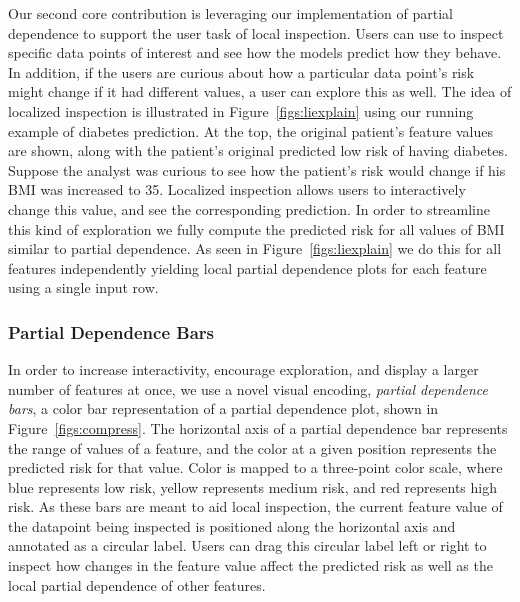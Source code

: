 


Our second core contribution is leveraging our implementation of partial dependence to support the user task of local inspection.  Users can use \prospector to inspect specific data points of interest and see how the models predict how they behave.  In addition, if the users are curious about how a particular data point's risk might change if it had different values, a user can explore this as well.  The idea of localized inspection is illustrated in Figure~\ref{figs:liexplain} using our running example of diabetes prediction.  At the top, the original patient's feature values are shown, along with the patient's original predicted low risk of having diabetes. Suppose the analyst was curious to see how the patient's risk would change if his BMI was increased to 35.
Localized inspection allows users to interactively change this value, and see the corresponding prediction.
In order to streamline this kind of exploration we fully compute the
predicted risk for all values of BMI similar to partial dependence.
As seen in Figure~\ref{figs:liexplain} we do this for all features independently
yielding local partial dependence plots for each feature using a single input row.



\subsubsection{Partial Dependence Bars}
In order to increase interactivity, encourage exploration, and display a larger number of features at once, we use a novel visual encoding, \emph{partial dependence bars}, a color bar representation of a partial dependence plot, shown in Figure~\ref{figs:compress}. The horizontal axis of a partial dependence bar represents the range of values of a feature, and the color at a given position represents the predicted risk for that value.  Color is mapped to a three-point color scale, where blue represents low risk, yellow represents medium risk, and red represents high risk.  As these bars are meant to aid local inspection, the current feature value of the datapoint being inspected is positioned along the horizontal axis and annotated as a circular label.  Users can drag this circular label left or right to inspect how changes in the feature value affect the predicted risk as well as the local partial dependence of other features.

